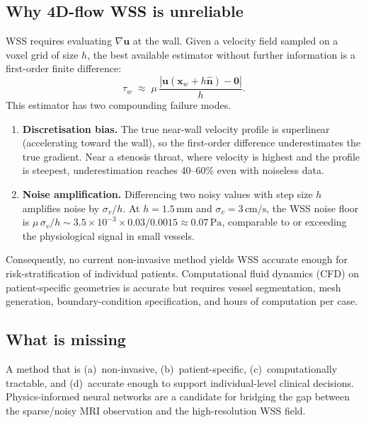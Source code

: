 \documentclass[11pt]{article}
\begin{document}
\subsection*{Why 4D-flow WSS is unreliable}

WSS requires evaluating $\nabla\mathbf{u}$ at the wall.  Given a velocity field
sampled on a voxel grid of size $h$, the best available estimator without further
information is a first-order finite difference:
\[
    \tau_w \;\approx\; \mu\,\frac{|\mathbf{u}(\mathbf{x}_w + h\hat{\mathbf{n}})
                         - \mathbf{0}|}{h}.
\]
This estimator has two compounding failure modes.
\begin{enumerate}[noitemsep]
\item \textbf{Discretisation bias.}
    The true near-wall velocity profile is superlinear (accelerating toward the wall),
    so the first-order difference underestimates the true gradient.
    Near a stenosis throat, where velocity is highest and the profile is steepest,
    underestimation reaches 40--60\% even with noiseless data.

\item \textbf{Noise amplification.}
    Differencing two noisy values with step size $h$ amplifies noise by $\sigma_v/h$.
    At $h = 1.5\,\text{mm}$ and $\sigma_v = 3\,\text{cm/s}$, the WSS noise floor is
    $\mu\,\sigma_v/h \sim 3.5 \times 10^{-3} \times 0.03 / 0.0015 \approx 0.07\,\text{Pa}$,
    comparable to or exceeding the physiological signal in small vessels.
\end{enumerate}

\noindent
Consequently, no current non-invasive method yields WSS accurate enough for
risk-stratification of individual patients.  Computational fluid dynamics (CFD) on
patient-specific geometries is accurate but requires vessel segmentation, mesh
generation, boundary-condition specification, and hours of computation per case.

\subsection*{What is missing}

A method that is (a)~non-invasive, (b)~patient-specific, (c)~computationally
tractable, and (d)~accurate enough to support individual-level clinical decisions.
Physics-informed neural networks are a candidate for bridging the gap between the
sparse/noisy MRI observation and the high-resolution WSS field.

\end{document}
